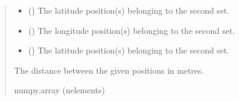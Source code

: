 \documentclass[letterpaper,10pt,english]{sphinxmanual}
\begin{document}
\begin{fulllineitems}
\begin{quote}
\begin{description}
\begin{itemize}
\item {} 
\sphinxAtStartPar
{} (\sphinxstyleliteralemphasis{\sphinxupquote{ (}}\sphinxstyleliteralemphasis{\sphinxupquote{)}}) \textendash{} The latitude position(s) belonging to the second set.

\item {} 
\sphinxAtStartPar
{} (\sphinxstyleliteralemphasis{\sphinxupquote{ (}}\sphinxstyleliteralemphasis{\sphinxupquote{)}}) \textendash{} The longitude position(s) belonging to the second set.

\item {} 
\sphinxAtStartPar
{} (\sphinxstyleliteralemphasis{\sphinxupquote{ (}}\sphinxstyleliteralemphasis{\sphinxupquote{)}}) \textendash{} The latitude position(s) belonging to the second set.

\end{itemize}

\sphinxAtStartPar
The distance between the given positions in metres.

\sphinxAtStartPar
numpy.array (n\sphinxhyphen{}elements)

\end{description}\end{quote}

\end{fulllineitems}

\end{document}
